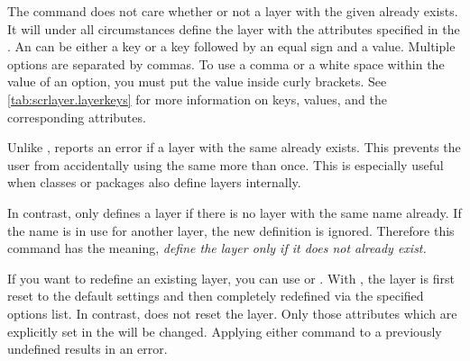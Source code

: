 The  command does not care whether or not a layer with the
given  already exists. It will under all circumstances
define the layer with the attributes specified in the . An
 can be either a key or a key followed by an equal sign and
a value. Multiple options are separated by commas. To use a comma or a white
space within the value of an option, you must put the value inside curly
brackets. See \autoref{tab:scrlayer.layerkeys} for more information on keys,
values, and the corresponding attributes.

Unlike ,  reports an error if a 
layer with the same  already exists. This prevents the user
from accidentally using the same  more than once. This 
is especially useful when classes or packages also define layers internally.

In contrast,  only defines a layer if there is no layer 
with the same name already. If the name is in use for another layer, the new 
definition is ignored. Therefore this command has the meaning, \emph{define
	the layer only if it does not already exist.}

If you want to redefine an existing layer, you can use  
or . With , the layer is first reset
to the default settings and then completely redefined via the specified 
options list. In contrast,  does not reset the layer.
Only those attributes which are explicitly set in the  will
be changed. Applying either command to a previously undefined  results in an error.

